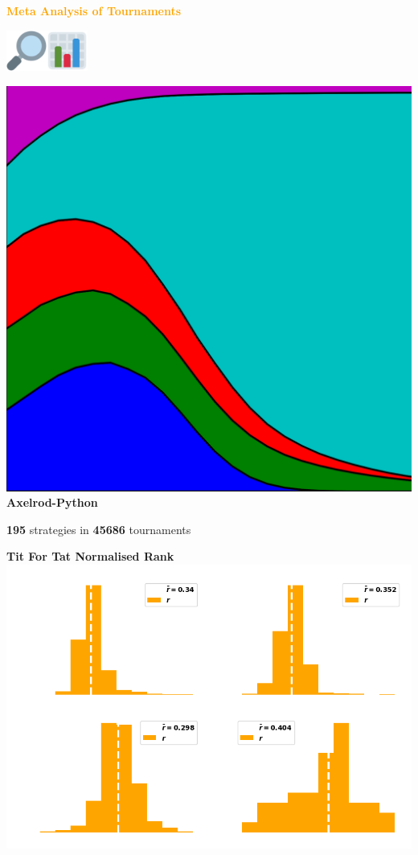 \documentclass{beamer}
\begin{document}
\begin{frame}
    \begin{center}
    \textcolor{orange}{\large{\textbf{Meta Analysis of Tournaments}}} \vspace{1cm}

    \includegraphics[width=0.10\textwidth]{static/look.png}\hspace{2pt}\includegraphics[width=0.10\textwidth]{static/bar.png}
    \end{center}
\end{frame}

\begin{frame}
    \begin{center}
        \includegraphics[width=.25\textwidth]{static/axelrod-logo.png} \\
        \textbf{Axelrod-Python}
    \end{center}
\end{frame}

\begin{frame}
    \begin{center}
    \Large{\textbf{195}} \small{strategies in} \Large{\textbf{45686}} \small{tournaments}
    \end{center}
\end{frame}

\begin{frame}
    \begin{center}
        \textbf{Tit For Tat Normalised Rank} \\ \vspace{1cm}
        \includegraphics[width=.8\textwidth]{static/tit_for_tat_r_distributions.png} 
    \end{center}
\end{frame}
\end{document}
